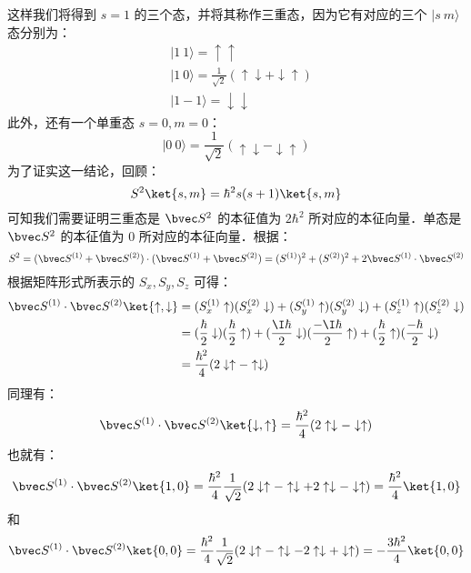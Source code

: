 这样我们将得到 $s=1$ 的三个态，并将其称作三重态，因为它有对应的三个 $|s\ m\rangle$ 态分别为：
\begin{align}
&|1 \ 1\rangle =\uparrow\uparrow\\
&|1 \ 0\rangle=\frac{1}{\sqrt{2}}(\uparrow\downarrow+\downarrow\uparrow)\\
&|1 -1\rangle=\downarrow\downarrow
\end{align}
此外，还有一个单重态 $s=0,m=0$：
\begin{equation}
|0\ 0\rangle = \frac{1}{\sqrt{2}}(\uparrow\downarrow-\downarrow\uparrow)
\end{equation}
为了证实这一结论，回顾：
\begin{equation}
S^2\ket{s, m} = \hbar^2 s(s+1)\ket{s, m} 
\end{equation}
可知我们需要证明三重态是 $\bvec S^2$ 的本征值为 $2\hbar^2$ 所对应的本征向量．单态是 $\bvec S^2$ 的本征值为 $0$ 所对应的本征向量．根据：
\begin{equation}
S^2=(\bvec S^{(1)}+\bvec S^{(2)})\cdot (\bvec S^{(1)}+\bvec S^{(2)})=( S^{(1)})^2+( S^{(2)})^2+2\bvec S^{(1)}\cdot \bvec S^{(2)}
\end{equation}
根据矩阵形式所表示的 $S_x,S_y,S_z$ 可得：
\begin{align}
\bvec S^{(1)}\cdot \bvec S^{(2)}\ket{\uparrow,\downarrow}&=(S_x^{(1)}\uparrow)(S_x^{(2)}\downarrow)+(S_y^{(1)}\uparrow)(S_y^{(2)}\downarrow)+(S_z^{(1)}\uparrow)(S_z^{(2)}\downarrow)\\
&=(\frac{\hbar}{2}\downarrow)(\frac{\hbar}{2}\uparrow)+(\frac{\I\hbar}{2}\downarrow)(\frac{-\I\hbar}{2}\uparrow)+(\frac{\hbar}{2}\uparrow)(\frac{-\hbar}{2}\downarrow)\\
&=\frac{\hbar^2}{4}(2\downarrow\uparrow-\uparrow\downarrow)
\end{align}
同理有：
\begin{equation}
\bvec S^{(1)}\cdot \bvec S^{(2)}\ket{\downarrow,\uparrow} = \frac{\hbar^2}{4}(2\uparrow\downarrow-\downarrow\uparrow)
\end{equation}
也就有：
\begin{equation}
\bvec S^{(1)}\cdot \bvec S^{(2)}\ket{1,0}=\frac{\hbar^2}{4}\frac{1}{\sqrt{2}}(2\downarrow\uparrow-\uparrow\downarrow+2\uparrow\downarrow-\downarrow\uparrow)=\frac{\hbar^2}{4}\ket{1,0} 
\end{equation}
和
\begin{equation}
\bvec S^{(1)}\cdot \bvec S^{(2)}\ket{0,0}=\frac{\hbar^2}{4}\frac{1}{\sqrt{2}}(2\downarrow\uparrow-\uparrow\downarrow-2\uparrow\downarrow+\downarrow\uparrow)=-\frac{3\hbar^2}{4}\ket{0,0} 
\end{equation}
